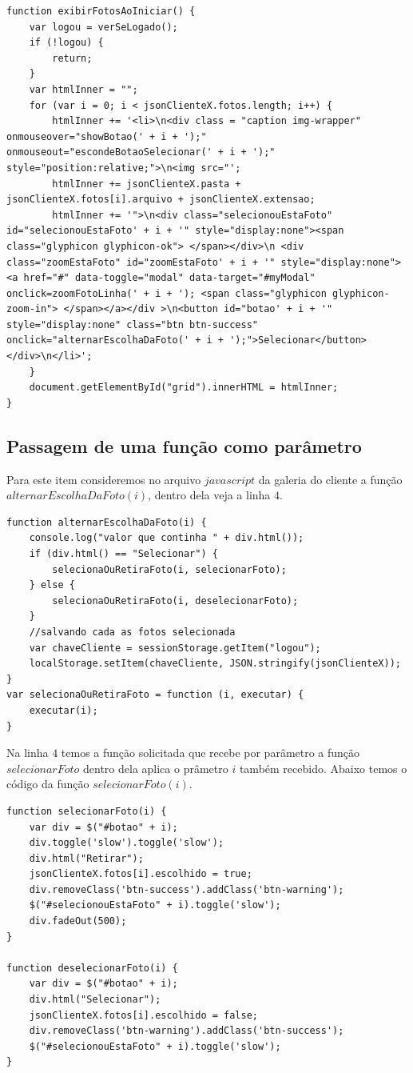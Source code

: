 \begin{lstlisting}
function exibirFotosAoIniciar() {
    var logou = verSeLogado();
    if (!logou) {
        return;
    }
    var htmlInner = "";
    for (var i = 0; i < jsonClienteX.fotos.length; i++) {
        htmlInner += '<li>\n<div class = "caption img-wrapper" onmouseover="showBotao(' + i + ');" onmouseout="escondeBotaoSelecionar(' + i + ');" style="position:relative;">\n<img src="';
        htmlInner += jsonClienteX.pasta + jsonClienteX.fotos[i].arquivo + jsonClienteX.extensao;
        htmlInner += '">\n<div class="selecionouEstaFoto" id="selecionouEstaFoto' + i + '" style="display:none"><span class="glyphicon glyphicon-ok"> </span></div>\n <div class="zoomEstaFoto" id="zoomEstaFoto' + i + '" style="display:none"><a href="#" data-toggle="modal" data-target="#myModal" onclick=zoomFotoLinha(' + i + '); <span class="glyphicon glyphicon-zoom-in"> </span></a></div >\n<button id="botao' + i + '" style="display:none" class="btn btn-success" onclick="alternarEscolhaDaFoto(' + i + ');">Selecionar</button></div>\n</li>';
    }
    document.getElementById("grid").innerHTML = htmlInner;
}
\end{lstlisting}


\subsection{Passagem de uma função como parâmetro}
	Para este item consideremos no arquivo $javascript$ da galeria do cliente a função $alternarEscolhaDaFoto(i)$, dentro dela veja a linha $4$.	
	
\begin{lstlisting}	
function alternarEscolhaDaFoto(i) {
    console.log("valor que continha " + div.html());
    if (div.html() == "Selecionar") {
        selecionaOuRetiraFoto(i, selecionarFoto);
    } else {
        selecionaOuRetiraFoto(i, deselecionarFoto);
    }
    //salvando cada as fotos selecionada
    var chaveCliente = sessionStorage.getItem("logou");
    localStorage.setItem(chaveCliente, JSON.stringify(jsonClienteX));
}
var selecionaOuRetiraFoto = function (i, executar) {
    executar(i);
}

\end{lstlisting}
	Na linha $4$ temos a função solicitada que recebe por parâmetro a função $selecionarFoto$ dentro dela aplica o prâmetro $i$ também recebido. Abaixo temos o código da função $selecionarFoto(i)$.
	
\begin{lstlisting}
function selecionarFoto(i) {
    var div = $("#botao" + i);
    div.toggle('slow').toggle('slow');
    div.html("Retirar");
    jsonClienteX.fotos[i].escolhido = true;
    div.removeClass('btn-success').addClass('btn-warning');
    $("#selecionouEstaFoto" + i).toggle('slow');
    div.fadeOut(500);
}

function deselecionarFoto(i) {
    var div = $("#botao" + i);
    div.html("Selecionar");
    jsonClienteX.fotos[i].escolhido = false;
    div.removeClass('btn-warning').addClass('btn-success');
    $("#selecionouEstaFoto" + i).toggle('slow');
}	
	\end{lstlisting}

